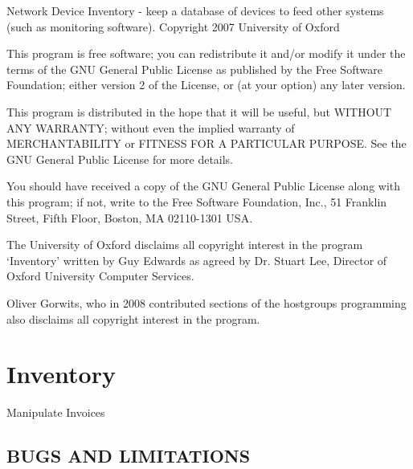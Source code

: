 \documentclass{book}
\begin{document}
Network Device Inventory - keep a database of devices to feed other systems (such as monitoring software). Copyright 2007 University of Oxford



This program is free software; you can redistribute it and/or modify it under the terms of the GNU General Public License as published by the Free Software Foundation; either version 2 of the License, or (at your option) any later version.



This program is distributed in the hope that it will be useful, but WITHOUT ANY WARRANTY; without even the implied warranty of MERCHANTABILITY or FITNESS FOR A PARTICULAR PURPOSE. See the GNU General Public License for more details.



You should have received a copy of the GNU General Public License along with this program; if not, write to the Free Software Foundation, Inc., 51 Franklin Street, Fifth Floor, Boston, MA 02110-1301 USA.



The University of Oxford disclaims all copyright interest in the program `Inventory' written by Guy Edwards as agreed by Dr. Stuart Lee, Director of Oxford University Computer Services.



Oliver Gorwits, who in 2008 contributed sections of the hostgroups programming also disclaims all copyright interest in the program.




\section{Inventory}
\label{_Inventory::Invoices}
\hypertarget{_Inventory::Invoices}{}



Manipulate Invoices


\subsection{BUGS AND LIMITATIONS}
\label{Inventory::Invoices_BUGS_AND_LIMITATIONS}
\hypertarget{Inventory::Invoices_BUGS_AND_LIMITATIONS}{}
\end{document}
